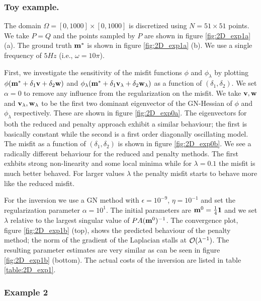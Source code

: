 \documentclass{iopart}
\begin{document}
\subsubsection{Toy example.}
The domain $\Omega = [0,1000]\times [0,1000]$ is discretized using $N=51\times 51$ points. We take $P=Q$ and the points sampled by 
$P$ are shown in figure \ref{fig:2D_exp1a} (a). The ground truth $\mathbf{m}^*$ is shown in figure  \ref{fig:2D_exp1a} (b). We use a single frequency
of $5 Hz$ (i.e., $\omega = 10\pi$).

First, we investigate the sensitivity of the misfit functions $\phi$ and $\phi_{\lambda}$ by plotting $\phi(\mathbf{m}^* + \delta_1 \mathbf{v} + \delta_2\mathbf{w})$ and
$\phi_{\lambda}(\mathbf{m}^* + \delta_1 \mathbf{v}_{\lambda} + \delta_2\mathbf{w}_{\lambda})$ as a function of $(\delta_1,\delta_2)$. We set $\alpha = 0$ to 
remove any influence from the regularization on the misfit.
We take $\mathbf{v}, \mathbf{w}$ and $\mathbf{v}_{\lambda}, \mathbf{w}_{\lambda}$ to be the first two dominant eigenvector of the GN-Hessian of 
$\phi$ and $\phi_{\lambda}$ respectively. These are shown in figure \ref{fig:2D_exp0a}. The eigenvectors for both the reduced and penalty
approach exhibit a similar behaviour; the first is basically constant while the second is a first order diagonally oscillating model.
The misfit as a function of $(\delta_1,\delta_2)$ is shown in figure \ref{fig:2D_exp0b}. We see a radically different behaviour for the reduced and penalty methods.
The first exhbits strong non-linearity and some local minima while for $\lambda=0.1$ the misfit is much better behaved. For larger values $\lambda$ the penalty misfit
starts to behave more like the reduced misfit.

For the inversion we use a GN method with $\epsilon=10^{-9}$, $\eta=10^{-1}$ and set the regularization parameter $\alpha = 10^{1}$.
The initial parameters are $\mathbf{m}^0 = \frac{1}{4}\mathbf{1}$ and we set $\lambda$ relative to the largest singular value of $PA(\mathbf{m}^0)^{-1}$.
The convergence plot, figure \ref{fig:2D_exp1b} (top), shows the predicted behaviour 
of the penalty method; the norm of the gradient of the Laplacian stalls at $\mathcal{O}(\lambda^{-1})$. 
The resulting parameter estimates are very similar as can be seen 
in figure \ref{fig:2D_exp1b} (bottom). The actual costs of the inversion are listed in table \ref{table:2D_exp1}.

\subsubsection{Example 2}
\end{document}
